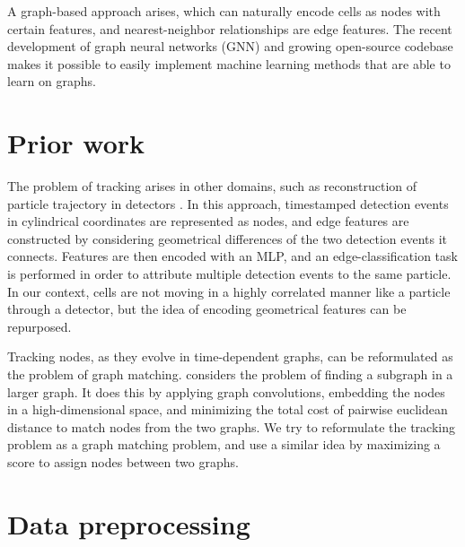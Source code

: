 \documentclass[10pt,conference,compsocconf,a4paper]{IEEEtran}
\begin{document}
	A graph-based approach arises, which can naturally encode cells as nodes with certain features, and nearest-neighbor relationships are edge features. The recent development of graph neural networks (GNN) \cite{zhou_graph_2021} and growing open-source codebase \cite{paszke_pytorch_2019, fey_fast_2019} makes it possible to easily implement machine learning methods that are able to learn on graphs.


\section{Prior work}

	The problem of tracking arises in other domains, such as reconstruction of particle trajectory in detectors \cite{dezoort_charged_2021}. In this approach, timestamped detection events in cylindrical coordinates are represented as nodes, and edge features are constructed by considering geometrical differences of the two detection events it connects. Features are then encoded with an MLP, and an edge-classification task is performed in order to attribute multiple detection events to the same particle. In our context, cells are not moving in a highly correlated manner like a particle through a detector, but the idea of encoding geometrical features can be repurposed.

	Tracking nodes, as they evolve in time-dependent graphs, can be reformulated as the problem of graph matching. \cite{kipf_semi-supervised_2017} considers the problem of finding a subgraph in a larger graph. It does this by applying graph convolutions, embedding the nodes in a high-dimensional space, and minimizing the total cost of pairwise euclidean distance to match nodes from the two graphs. We try to reformulate the tracking problem as a graph matching problem, and use a similar idea by maximizing a score to assign nodes between two graphs.



\section{Data preprocessing} \label{sec:data_preprocessing}
\end{document}
